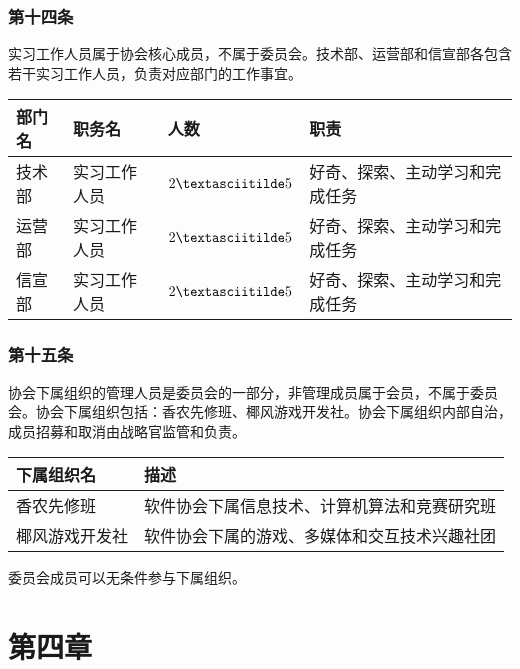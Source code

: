 \documentclass[
]{ctexart}
\begin{document}
\hypertarget{ux7b2cux5341ux56dbux6761-ux5b9eux4e60ux5de5ux4f5cux4ebaux5458}{%
\subsubsection{第十四条}\label{ux7b2cux5341ux56dbux6761-ux5b9eux4e60ux5de5ux4f5cux4ebaux5458}}

实习工作人员属于协会核心成员，不属于委员会。技术部、运营部和信宣部各包含若干实习工作人员，负责对应部门的工作事宜。

\begin{longtable}[]{@{}llll@{}}
\toprule()
\textbf{部门名} & \textbf{职务名} & \textbf{人数} & \textbf{职责} \\
\midrule()
\endhead
技术部 & 实习工作人员 & \(2\textasciitilde 5\) &
好奇、探索、主动学习和完成任务 \\
运营部 & 实习工作人员 & \(2\textasciitilde 5\) &
好奇、探索、主动学习和完成任务 \\
信宣部 & 实习工作人员 & \(2\textasciitilde 5\) &
好奇、探索、主动学习和完成任务 \\
\bottomrule()
\end{longtable}

\hypertarget{ux7b2cux5341ux4e94ux6761-ux534fux4f1aux4e0bux5c5eux7ec4ux7ec7}{%
\subsubsection{第十五条}\label{ux7b2cux5341ux4e94ux6761-ux534fux4f1aux4e0bux5c5eux7ec4ux7ec7}}

协会下属组织的管理人员是委员会的一部分，非管理成员属于会员，不属于委员会。协会下属组织包括：香农先修班、椰风游戏开发社。协会下属组织内部自治，成员招募和取消由战略官监管和负责。

\begin{longtable}[]{@{}ll@{}}
\toprule()
\textbf{下属组织名} & \textbf{描述} \\
\midrule()
\endhead
香农先修班 & 软件协会下属信息技术、计算机算法和竞赛研究班 \\
椰风游戏开发社 & 软件协会下属的游戏、多媒体和交互技术兴趣社团 \\
\bottomrule()
\end{longtable}

委员会成员可以无条件参与下属组织。

\hypertarget{ux7b2cux56dbux7ae0-ux8d22ux52a1ux5236ux5ea6}{%
\section{第四章}\label{ux7b2cux56dbux7ae0-ux8d22ux52a1ux5236ux5ea6}}
\end{document}
